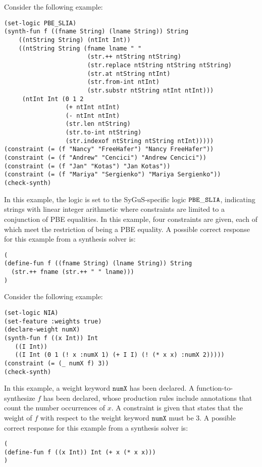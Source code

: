\documentclass[english,a4paper,10pt]{article}
\begin{document}
\begin{example}
Consider the following example:
\begin{lstlisting}[language=SyGuS]
(set-logic PBE_SLIA)
(synth-fun f ((fname String) (lname String)) String
    ((ntString String) (ntInt Int))
    ((ntString String (fname lname " "
                       (str.++ ntString ntString)
                       (str.replace ntString ntString ntString)
                       (str.at ntString ntInt)
                       (str.from-int ntInt)
                       (str.substr ntString ntInt ntInt)))
     (ntInt Int (0 1 2
                 (+ ntInt ntInt)
                 (- ntInt ntInt)
                 (str.len ntString)
                 (str.to-int ntString)
                 (str.indexof ntString ntString ntInt)))))
(constraint (= (f "Nancy" "FreeHafer") "Nancy FreeHafer"))
(constraint (= (f "Andrew" "Cencici") "Andrew Cencici"))
(constraint (= (f "Jan" "Kotas") "Jan Kotas"))
(constraint (= (f "Mariya" "Sergienko") "Mariya Sergienko"))
(check-synth)
\end{lstlisting}
In this example, the logic is set to the SyGuS-specific logic
${\tt PBE\_SLIA}$, indicating strings with linear integer arithmetic
where constraints are limited to a conjunction of PBE equalities.
In this example, four constraints are given, each of which meet the
restriction of being a PBE equality.
A possible correct response for this example from a synthesis solver is:
\begin{lstlisting}[language=SyGuS]
(
(define-fun f ((fname String) (lname String)) String
  (str.++ fname (str.++ " " lname)))
)
\end{lstlisting}
\end{example}

\begin{example}[Weights]
Consider the following example:
\begin{lstlisting}[language=SyGuS]
(set-logic NIA)
(set-feature :weights true)
(declare-weight numX)
(synth-fun f ((x Int)) Int
   ((I Int))
   ((I Int (0 1 (! x :numX 1) (+ I I) (! (* x x) :numX 2)))))
(constraint (= (_ numX f) 3))
(check-synth)
\end{lstlisting}
In this example, a weight keyword $\texttt{numX}$ has been declared.
A function-to-synthesize $f$ has been declared, whose production
rules include annotations that count the number occurrences of $x$.
A constraint is given that states that the weight of $f$ with respect to
the weight keyword $\texttt{numX}$ must be $3$.
A possible correct response for this example from a synthesis solver is:
\begin{lstlisting}[language=SyGuS]
(
(define-fun f ((x Int)) Int (+ x (* x x)))
)
\end{lstlisting}
\end{example}
\end{document}
